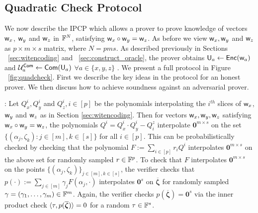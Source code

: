\subsection{Quadratic Check Protocol}\label{sec:quadcheck}
We now describe the IPCP which allows a prover to prove knowledge of vectors
$\mathsf{w}_x$, $\mathsf{w}_y$ and $\mathsf{w}_z$ in $\mathbb{F}^N$, satisfying $\mathsf{w}_x\circ \mathsf{w}_y =
\mathsf{w}_z$. As before we view $\mathsf{w}_x, \mathsf{w}_y$ and $\mathsf{w}_z$ as $p \times m \times s$ matrix, where $N=pms$. 
As described previously in Sections ~\ref{sec:witencoding} and ~\ref{sec:construct_oracle}, the prover obtains $\mathsf{U}_a \leftarrow \mathsf{Enc}(\mathsf{w}_a)$ and $\mathcal{U}^{\mathsf{Com}}_a \leftarrow \mathsf{Com}(\mathsf{U}_a)$ $\forall a\in \{x,y,z\}$ . We present a full protocol in Figure ~\ref{fig:quadcheck}. First we describe the key ideas in the protocol for an honest prover. We then discuss how to achieve soundness against an adversarial prover.


: Let $Q^i_x,Q^i_y$ and $Q^i_z, i\in [p]$ be the
polynomials interpolating the $i^{th}$ slices of $\mathsf{w}_x$, $\mathsf{w}_y$ and $\mathsf{w}_z$
 as in Section \ref{sec:witencoding}. Then for vectors $\mathsf{w}_x,\mathsf{w}_y,\mathsf{w}_z$ satisfying
$\mathsf{w}_x\circ \mathsf{w}_y=\mathsf{w}_z$, the polynomials $Q^i=Q^i_x\cdot Q^i_y - Q^z_i$ interpolate
$\bm{0}^{m\times s}$ on the set $\{(\alpha_j,\zeta_k):j\in [m],k\in [s]\}$ for all $i\in [p]$. This can be probabilistically
checked by checking that the polynomial $F := \sum_{i\in [p]}r_iQ^i$ interpolates
$\bm{0}^{m\times s}$ on the above set for randomly sampled $r\in \mathbb{F}^p$. 
To check that $F$ interpolates $\bm{0}^{m\times s}$ on the points
$\{(\alpha_j,\zeta_k)\}_{j\in [m],k\in [s]}$, the verifier checks that
$p(\cdot) := \sum_{j\in [m]}\gamma_jF(\alpha_j,\cdot)$ interpolates $\bm{0}^s$ on
$\overline{\bm{\zeta}}$ for randomly sampled $\gamma=(\gamma_1,\ldots,\gamma_m)\in \mathbb{F}^m$.
Again, the verifier checks $p(\overline{\bm{\zeta}})=\bm{0}^s$ via the inner product
check $\langle \tau,p(\overline{\bm{\zeta}})\rangle=0$ for a random $\tau\in \mathbb{F}^s$. 

